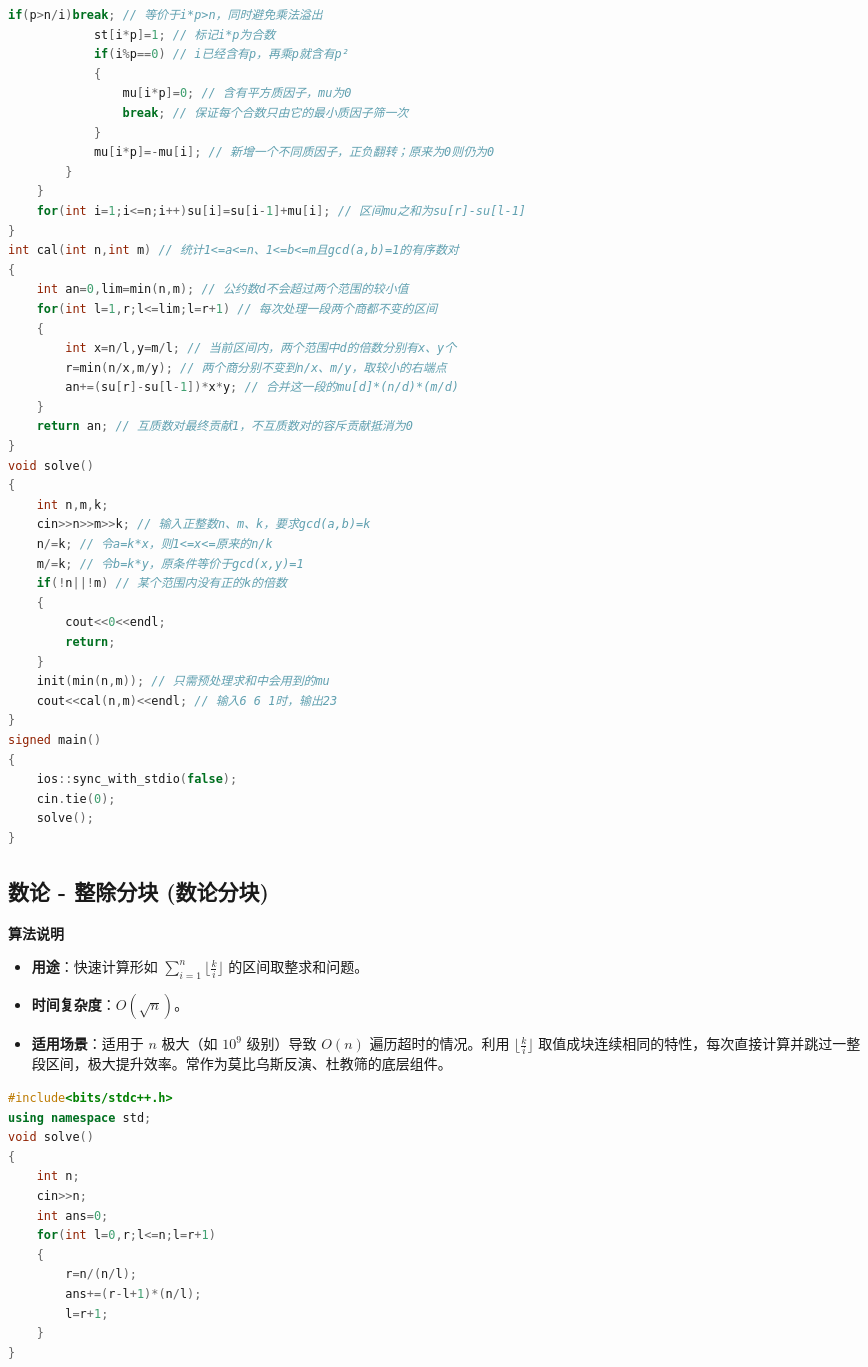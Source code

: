 \documentclass[10pt,landscape,a4paper]{article}
\begin{document}
\begin{multicols*}{3}
\begin{lstlisting}[language=C++]
            if(p>n/i)break; // 等价于i*p>n，同时避免乘法溢出
            st[i*p]=1; // 标记i*p为合数
            if(i%p==0) // i已经含有p，再乘p就含有p²
            {
                mu[i*p]=0; // 含有平方质因子，mu为0
                break; // 保证每个合数只由它的最小质因子筛一次
            }
            mu[i*p]=-mu[i]; // 新增一个不同质因子，正负翻转；原来为0则仍为0
        }
    }
    for(int i=1;i<=n;i++)su[i]=su[i-1]+mu[i]; // 区间mu之和为su[r]-su[l-1]
}
int cal(int n,int m) // 统计1<=a<=n、1<=b<=m且gcd(a,b)=1的有序数对
{
    int an=0,lim=min(n,m); // 公约数d不会超过两个范围的较小值
    for(int l=1,r;l<=lim;l=r+1) // 每次处理一段两个商都不变的区间
    {
        int x=n/l,y=m/l; // 当前区间内，两个范围中d的倍数分别有x、y个
        r=min(n/x,m/y); // 两个商分别不变到n/x、m/y，取较小的右端点
        an+=(su[r]-su[l-1])*x*y; // 合并这一段的mu[d]*(n/d)*(m/d)
    }
    return an; // 互质数对最终贡献1，不互质数对的容斥贡献抵消为0
}
void solve()
{
    int n,m,k;
    cin>>n>>m>>k; // 输入正整数n、m、k，要求gcd(a,b)=k
    n/=k; // 令a=k*x，则1<=x<=原来的n/k
    m/=k; // 令b=k*y，原条件等价于gcd(x,y)=1
    if(!n||!m) // 某个范围内没有正的k的倍数
    {
        cout<<0<<endl;
        return;
    }
    init(min(n,m)); // 只需预处理求和中会用到的mu
    cout<<cal(n,m)<<endl; // 输入6 6 1时，输出23
}
signed main()
{
    ios::sync_with_stdio(false);
    cin.tie(0);
    solve();
}
\end{lstlisting}
\subsection*{数论 - 整除分块 (数论分块)}
\par\addvspace{0.7ex}\noindent\textbf{算法说明}\par\nobreak
\begin{itemize}
\item \textbf{用途}：快速计算形如 $\sum_{i=1}^n \lfloor \frac{k}{i} \rfloor$ 的区间取整求和问题。
\item \textbf{时间复杂度}：$O(\sqrt{n})$。
\item \textbf{适用场景}：适用于 $n$ 极大（如 $10^9$ 级别）导致 $O(n)$ 遍历超时的情况。利用 $\lfloor \frac{k}{i} \rfloor$ 取值成块连续相同的特性，每次直接计算并跳过一整段区间，极大提升效率。常作为莫比乌斯反演、杜教筛的底层组件。
\end{itemize}
\par{}\par
\begin{lstlisting}[language=C++]
#include<bits/stdc++.h>
using namespace std;
void solve()
{
    int n;
    cin>>n;
    int ans=0;
    for(int l=0,r;l<=n;l=r+1)
    {
        r=n/(n/l);
        ans+=(r-l+1)*(n/l);
        l=r+1;
    }
}
\end{lstlisting}

\end{multicols*}
\end{document}
